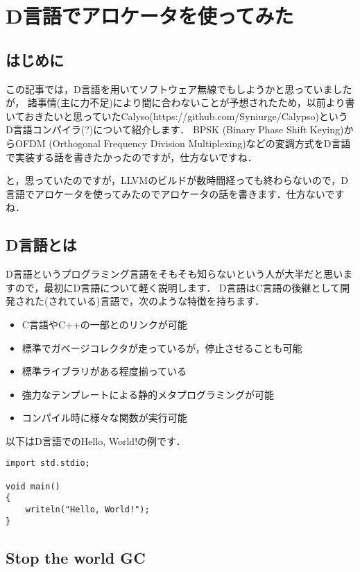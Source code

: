 \chapter{D言語でアロケータを使ってみた}

\section{はじめに}

この記事では，D言語を用いてソフトウェア無線でもしようかと思っていましたが，
諸事情(主に力不足)により間に合わないことが予想されたため，以前より書いておきたいと思っていたCalyso(https://github.com/Syniurge/Calypso)というD言語コンパイラ(?)について紹介します．
BPSK (Binary Phase Shift Keying)からOFDM (Orthogonal Frequency Division Multiplexing)などの変調方式をD言語で実装する話を書きたかったのですが，仕方ないですね．

と，思っていたのですが，LLVMのビルドが数時間経っても終わらないので，D言語でアロケータを使ってみたのでアロケータの話を書きます．仕方ないですね．



\section{D言語とは}

D言語というプログラミング言語をそもそも知らないという人が大半だと思いますので，最初にD言語について軽く説明します．
D言語はC言語の後継として開発された(されている)言語で，次のような特徴を持ちます．

\begin{itemize}
\item C言語やC++の一部とのリンクが可能
\item 標準でガベージコレクタが走っているが，停止させることも可能
\item 標準ライブラリがある程度揃っている
\item 強力なテンプレートによる静的メタプログラミングが可能
\item コンパイル時に様々な関数が実行可能
\end{itemize}

\newpage
以下はD言語でのHello, World!の例です．

\begin{lstlisting}[]
import std.stdio;

void main()
{
    writeln("Hello, World!");
}
\end{lstlisting}


\section{Stop the world GC}

